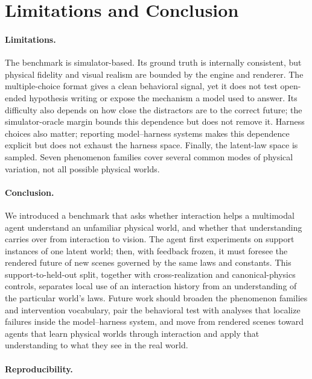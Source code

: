\section{Limitations and Conclusion}
\label{sec:conclusion}

\paragraph{Limitations.} The benchmark is simulator-based. Its ground truth is internally consistent, but physical fidelity and visual realism are bounded by the engine and renderer. The multiple-choice format gives a clean behavioral signal, yet it does not test open-ended hypothesis writing or expose the mechanism a model used to answer. Its difficulty also depends on how close the distractors are to the correct future; the simulator-oracle margin bounds this dependence but does not remove it. Harness choices also matter; reporting model--harness systems makes this dependence explicit but does not exhaust the harness space. Finally, the latent-law space is sampled. Seven phenomenon families cover several common modes of physical variation, not all possible physical worlds. 

\paragraph{Conclusion.} We introduced a benchmark that asks whether interaction helps a multimodal agent understand an unfamiliar physical world, and whether that understanding carries over from interaction to vision. The agent first experiments on support instances of one latent world; then, with feedback frozen, it must foresee the rendered future of new scenes governed by the same laws and constants. This support-to-held-out split, together with cross-realization and canonical-physics controls, separates local use of an interaction history from an understanding of the particular world's laws.  Future work should broaden the phenomenon families and intervention vocabulary, pair the behavioral test with analyses that localize failures inside the model--harness system, and move from rendered scenes toward agents that learn physical worlds through interaction and apply that understanding to what they see in the real world.

\paragraph{Reproducibility.} 
